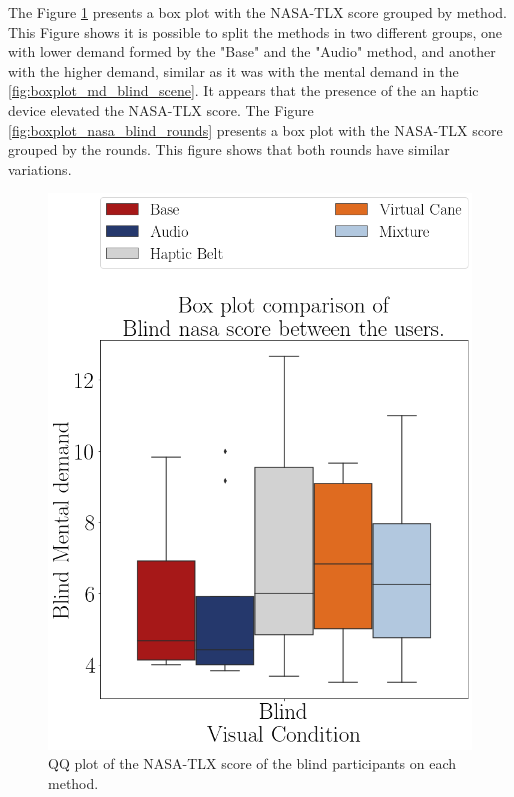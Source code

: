 The Figure \ref{fig:boxplot_nasa_blind_scene} presents a box plot with the NASA-TLX score grouped by method. This Figure shows it is possible to split the methods in two different groups, one with lower demand formed by the "Base" and the "Audio" method, and another with the higher demand, similar as it was with the mental demand in the \ref{fig:boxplot_md_blind_scene}. It appears that the presence of the an haptic device elevated the NASA-TLX score. The Figure \ref{fig:boxplot_nasa_blind_rounds} presents a box plot with the NASA-TLX score grouped by the rounds. This figure shows that both rounds have similar variations.

\begin{figure}[!htb]
    \centering
    \begin{minipage}{0.45\textwidth}
        \centering
        \includegraphics[width = 0.8\linewidth]{Resultados/Nasa/Figuras/png/boxplot_nasa_blind_scene.png}
        \caption{QQ plot of the NASA-TLX score of the blind participants on each method.}
        \label{fig:boxplot_nasa_blind_scene}
    \end{minipage}
    \begin{minipage}{0.45\textwidth}
        \centering

\end{minipage}
\end{figure}
